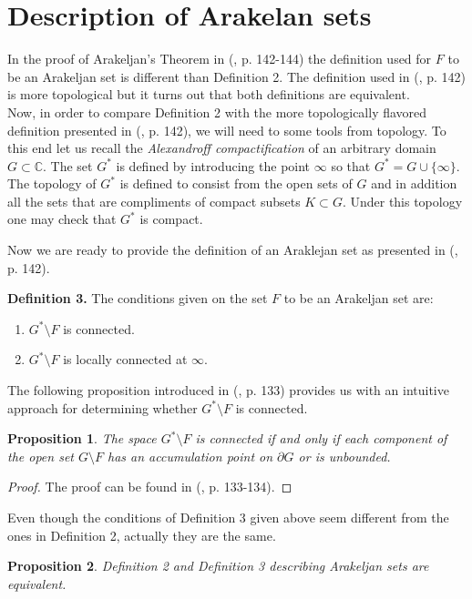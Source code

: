 \documentclass[12pt]{article}
\newtheorem{prp}{Proposition}
\begin{document}
\section*{Description of Arakelan sets}
 In the proof of {Arakeljan's Theorem} in (\cite{GA}, p. 142-144) the definition used for $F$ to be an Arakeljan set is different than {Definition 2}. The definition used in (\cite{GA}, p. 142) is more topological but it turns out that both definitions are equivalent.\\
\indent  Now, in order to compare {Definition 2} with the more topologically flavored definition presented in (\cite{GA}, p. 142), we will need to some tools from topology. To this end let us recall the \emph{Alexandroff compactification} of an arbitrary domain $G\subset \mathbb{C}$. The set $G^*$ is defined by introducing the point $\infty$ so that $G^*=G\cup \lbrace\infty\rbrace$. The topology of $G^*$ is defined to consist from the open sets of $G$ and in addition all the sets that are compliments of compact subsets $K\subset G$. Under this topology one may check that $G^*$ is compact.\vspace{0.12in}
 
 Now we are ready to provide the definition of an Araklejan set as presented in (\cite{GA}, p. 142).\vspace{0.12in}
 

\noindent\textbf{Definition 3.} The conditions given on the set $F$ to be an Arakeljan set are: \begin{enumerate}
\item$G^*\setminus F$ is connected.
\item$G^*\setminus F$ is locally connected at $\infty$.
\end{enumerate}

 The following proposition introduced in (\cite{GA}, p. 133) provides us with an intuitive approach for determining whether $G^*\setminus F$ is connected.

\begin{prp}
The space $G^*\setminus F$ is connected if and only if each component of the open set $G\setminus F$ has an accumulation point on $\partial G$ or is unbounded.
\end{prp}

\begin{proof}
The proof can be found in (\cite{GA}, p. 133-134).
\end{proof}

Even though the conditions of {Definition 3} given above seem different from the ones in {Definition 2}, actually they are the same.
\begin{prp}
Definition 2 and Definition 3 describing Arakeljan sets are equivalent.
\end{prp}  
\end{document}
